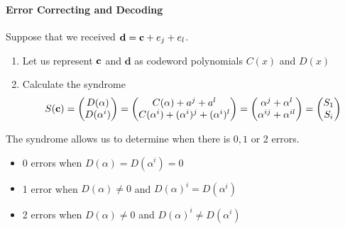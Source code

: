 \paragraph{Error Correcting and Decoding}
Suppose that we received \(\mathbf{d} = \mathbf{c} + e_j + e_l\).
\begin{enumerate}
    \item Let us represent \(\mathbf{c}\) and \(\mathbf{d}\) as codeword polynomials \(C(x)\) and \(D(x)\)
    \item Calculate the syndrome
          \[S(\mathbf{c}) = \begin{pmatrix}
                  D(\alpha) \\
                  D(\alpha^i)
              \end{pmatrix} = \begin{pmatrix}
                  C(\alpha) + a^j + a^l \\
                  C(\alpha^i) + (\alpha^i)^j + (\alpha^i)^l
              \end{pmatrix} = \begin{pmatrix}
                  \alpha^j + \alpha^l \\
                  \alpha^{ij} + \alpha^{il}
              \end{pmatrix} = \begin{pmatrix}
                  S_1 \\
                  S_i
              \end{pmatrix}
          \]
\end{enumerate}
The syndrome allows us to determine when there is \(0, 1\) or 2 errors.
\begin{itemize}
    \item 0 errors when \(D(\alpha) = D(\alpha^i) = 0\)
    \item 1 error when \(D(\alpha) \neq 0\) and \(D(\alpha)^i = D(\alpha^i)\)
    \item 2 errors when \(D(\alpha) \neq 0\) and \(D(\alpha)^i \neq D(\alpha^i)\)
\end{itemize}

\newpage